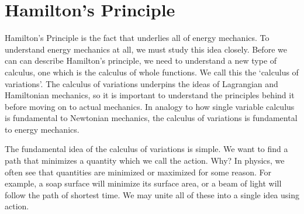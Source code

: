 \documentclass[10pt, openany, titlepage]{book}
\theoremstyle{definition}
\newcounter{example}[chapter]
\begin{document}
\section{Hamilton's Principle}

Hamilton's Principle is the fact that underlies all of energy mechanics. To understand energy mechanics at all, we must study this idea closely. Before we can can describe Hamilton's principle, we need to understand a new type of calculus, one which is the calculus of whole functions. We call this the `calculus of variations'. The calculus of variations underpins the ideas of \gls{Lagrangian} and Hamiltonian mechanics, so it is important to understand the principles behind it before moving on to actual mechanics. In analogy to how single variable calculus is fundamental to Newtonian mechanics, the calculus of variations is fundamental to energy mechanics.

The fundamental idea of the calculus of variations is simple. We want to find a path that minimizes a quantity which we call the \gls{action}. Why? In physics, we often see that quantities are minimized or maximized for some reason. For example, a soap surface will minimize its surface area, or a beam of light will follow the path of shortest time. We may unite all of these into a single idea using \gls{action}.
\end{document}
